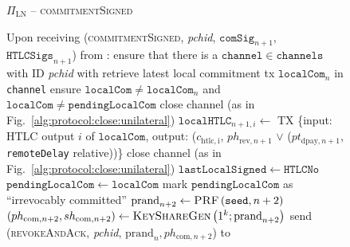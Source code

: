 
  \begin{figure}[H]
    \begin{protocolbox}{$\Pi_{\mathrm{LN}}$ -- \textsc{commitmentSigned}}
      \begin{algorithmic}[1]
        \State Upon receiving (\textsc{commitmentSigned}, \textit{pchid},
        $\mathtt{comSig}_{n+1}$, $\mathtt{HTLCSigs}_{n+1}$) from \bob:
        \Indent
          \State ensure that there is a $\mathtt{channel} \in \mathtt{channels}$
          with ID \textit{pchid} with \bob
          \State retrieve latest local commitment tx $\mathtt{localCom}_n$ in
          \texttt{channel}
          \State ensure $\mathtt{localCom} \neq \mathtt{localCom}_n$ and
          $\mathtt{localCom} \neq \mathtt{pendingLocalCom}$
            \State close channel (as in Fig.~\ref{alg:protocol:close:unilateral})
            \State \Return
          \EndIf
            \State $\mathtt{localHTLC}_{n+1, i} \gets$ TX \{input: HTLC output
            $i$ of $\mathtt{localCom}$, output: ($c_{\mathrm{htlc, i}}$,
            $ph_{\mathrm{rev}, n+1}$ $\vee$ ($pt_{\mathrm{dpay}, n+1}$,
            \texttt{remoteDelay} relative))\}
              \State close channel (as in
              Fig.~\ref{alg:protocol:close:unilateral})
              \State \Return
            \EndIf
          \EndFor
          \State $\mathtt{lastLocalSigned} \gets \mathtt{HTLCNo}$
          \State $\mathtt{pendingLocalCom} \gets \mathtt{localCom}$
          \State mark $\mathtt{pendingLocalCom}$ as ``irrevocably committed''
          \State $\mathrm{prand}_{n+2} \gets \textsc{PRF}\left(\mathtt{seed},
          n+2\right)$
          \label{alg:protocol:pay:commitmentSigned:prf}
          \State $\left(ph_{\mathrm{com}, n+2}, sh_{\mathrm{com}, n+2}\right)
          \gets \textsc{KeyShareGen}\left(1^k; \mathrm{prand}_{n+2}\right)$
          \State send (\textsc{revokeAndAck}, \textit{pchid}, $\mathrm{prand}_n,
          ph_{\mathrm{com}, n+2}$) to \bob
        \EndIndent
      \end{algorithmic}
    \end{protocolbox}
    \caption{}
    \label{alg:protocol:pay:commitmentSigned}
  \end{figure}

